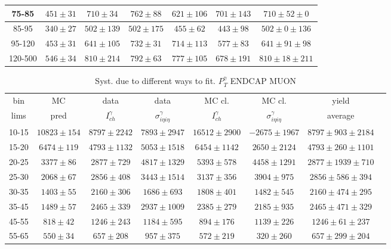 \begin{table}[h]
\begin{center}
\begin{tabular}{|c|c|c|c|c|c|c|}
    75-85 & $451\pm31$ & $710\pm34$ & $762\pm88$ & $621\pm106$ & $701\pm143$ &$710\pm52\pm0$  \\ \hline
    85-95 & $340\pm27$ & $502\pm139$ & $502\pm175$ & $455\pm62$ & $443\pm98$ &$502\pm0\pm136$  \\ \hline
    95-120 & $453\pm31$ & $641\pm105$ & $732\pm31$ & $714\pm113$ & $577\pm83$ &$641\pm91\pm98$  \\ \hline
    120-500 & $546\pm34$ & $810\pm214$ & $792\pm63$ & $777\pm105$ & $678\pm191$ &$810\pm18\pm211$  \\ \hline
  \end{tabular}
  \label{tab:diff_ways_to_fit_phoEt_BARREL_muon}
  \end{center}
\end{table}

\begin{table}[h]
  \tiny
  \begin{center}
  \caption{Syst. due to different ways to fit. $P_T^{\gamma}$ ENDCAP MUON}
  \begin{tabular}{|c|c|c|c|c|c|c|c|}
    bin &  MC   & data  & data  & MC cl. & MC cl. & yield \\ 
    lims & pred & $I_{ch}^{\gamma}$ & $\sigma_{i\eta i\eta}^\gamma$  & $I_{ch}^{\gamma}$  & $\sigma_{i\eta i\eta}^\gamma$   & average\\ \hline
    10-15 & $10823\pm154$ & $8797\pm2242$ & $7893\pm2947$ & $16512\pm2900$ & $-2675\pm1967$ &$8797\pm903\pm2184$  \\ \hline
    15-20 & $6474\pm119$ & $4793\pm1132$ & $5053\pm1518$ & $6454\pm1142$ & $2650\pm2124$ &$4793\pm260\pm1101$  \\ \hline
    20-25 & $3377\pm86$ & $2877\pm729$ & $4817\pm1329$ & $5393\pm578$ & $4458\pm1291$ &$2877\pm1939\pm710$  \\ \hline
    25-30 & $2068\pm67$ & $2856\pm408$ & $3443\pm1514$ & $3137\pm356$ & $3904\pm975$ &$2856\pm586\pm394$  \\ \hline
    30-35 & $1403\pm55$ & $2160\pm306$ & $1686\pm693$ & $1808\pm401$ & $1482\pm545$ &$2160\pm474\pm295$  \\ \hline
    35-45 & $1489\pm57$ & $2465\pm339$ & $2937\pm1009$ & $2385\pm279$ & $2185\pm935$ &$2465\pm471\pm329$  \\ \hline
    45-55 & $818\pm42$ & $1246\pm243$ & $1184\pm595$ & $894\pm176$ & $1139\pm226$ &$1246\pm61\pm237$  \\ \hline
    55-65 & $550\pm34$ & $657\pm208$ & $957\pm375$ & $572\pm219$ & $320\pm260$ &$657\pm299\pm204$  \\ \hline

\end{tabular}
\end{center}
\end{table}
